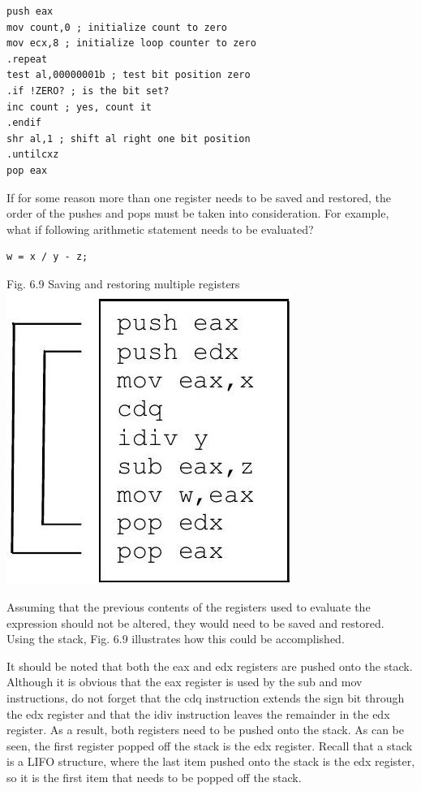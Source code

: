 \documentclass[10pt]{article}
\begin{document}
\begin{verbatim}
push eax
mov count,0 ; initialize count to zero
mov ecx,8 ; initialize loop counter to zero
.repeat
test al,00000001b ; test bit position zero
.if !ZERO? ; is the bit set?
inc count ; yes, count it
.endif
shr al,1 ; shift al right one bit position
.untilcxz
pop eax
\end{verbatim}

If for some reason more than one register needs to be saved and restored, the order of the pushes and pops must be taken into consideration. For example, what if following arithmetic statement needs to be evaluated?

\begin{verbatim}
w = x / y - z;
\end{verbatim}

Fig. 6.9 Saving and restoring multiple registers\\
\includegraphics[max width=\textwidth, center]{2025_03_24_ebe50cc223a6fbc49eecg-126}

Assuming that the previous contents of the registers used to evaluate the expression should not be altered, they would need to be saved and restored. Using the stack, Fig. 6.9 illustrates how this could be accomplished.

It should be noted that both the eax and edx registers are pushed onto the stack. Although it is obvious that the eax register is used by the sub and mov instructions, do not forget that the cdq instruction extends the sign bit through the edx register and that the idiv instruction leaves the remainder in the edx register. As a result, both registers need to be pushed onto the stack. As can be seen, the first register popped off the stack is the edx register. Recall that a stack is a LIFO structure, where the last item pushed onto the stack is the edx register, so it is the first item that needs to be popped off the stack.
\end{document}
